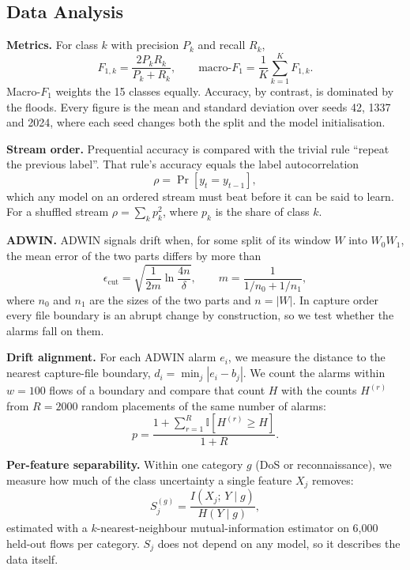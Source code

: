 \documentclass[conference]{IEEEtran}
\begin{document}
\subsection{Data Analysis}

\textbf{Metrics.} For class $k$ with precision $P_k$ and recall $R_k$,
\begin{equation}
F_{1,k} = \frac{2 P_k R_k}{P_k + R_k}, \qquad
\text{macro-}F_1 = \frac{1}{K} \sum_{k=1}^{K} F_{1,k}.
\label{eq:f1}
\end{equation}
Macro-$F_1$ weights the 15 classes equally. Accuracy, by contrast, is dominated by the floods. Every figure is the mean and standard deviation over seeds 42, 1337 and 2024, where each seed changes both the split and the model initialisation.

\textbf{Stream order.} Prequential accuracy is compared with the trivial rule ``repeat the previous label''. That rule's accuracy equals the label autocorrelation
\begin{equation}
\rho = \Pr\left[y_t = y_{t-1}\right],
\label{eq:rho}
\end{equation}
which any model on an ordered stream must beat before it can be said to learn. For a shuffled stream $\rho = \sum_k p_k^2$, where $p_k$ is the share of class $k$.

\textbf{ADWIN.} ADWIN signals drift when, for some split of its window $W$ into $W_0 W_1$, the mean error of the two parts differs by more than
\begin{equation}
\epsilon_{\text{cut}} = \sqrt{\frac{1}{2m}\ln\frac{4n}{\delta}}, \qquad m = \frac{1}{1/n_0 + 1/n_1},
\label{eq:adwin}
\end{equation}
where $n_0$ and $n_1$ are the sizes of the two parts and $n = |W|$. In capture order every file boundary is an abrupt change by construction, so we test whether the alarms fall on them.

\textbf{Drift alignment.} For each ADWIN alarm $e_i$, we measure the distance to the nearest capture-file boundary, $d_i = \min_j |e_i - b_j|$. We count the alarms within $w = 100$ flows of a boundary and compare that count $H$ with the counts $H^{(r)}$ from $R = 2000$ random placements of the same number of alarms:
\begin{equation}
p = \frac{1 + \sum_{r=1}^{R}\mathbb{I}\left[H^{(r)} \ge H\right]}{1 + R}.
\label{eq:pvalue}
\end{equation}

\textbf{Per-feature separability.} Within one category $g$ (DoS or reconnaissance), we measure how much of the class uncertainty a single feature $X_j$ removes:
\begin{equation}
S_j^{(g)} = \frac{I\left(X_j;\,Y \mid g\right)}{H\left(Y \mid g\right)},
\label{eq:sep}
\end{equation}
estimated with a $k$-nearest-neighbour mutual-information estimator \cite{b17} on 6,000 held-out flows per category. $S_j$ does not depend on any model, so it describes the data itself.
\end{document}

